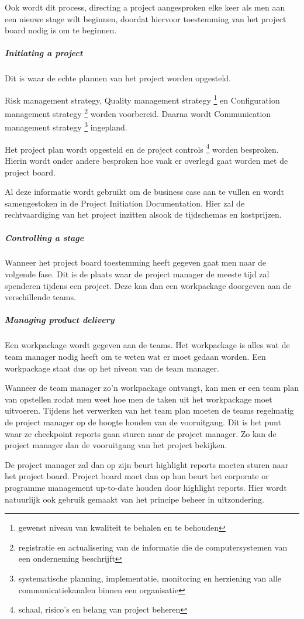 \documentclass[]{article}
\begin{document}
Ook wordt dit process, directing a project aangesproken elke keer als men aan een nieuwe stage wilt beginnen, doordat hiervoor toestemming van het project board nodig is om te beginnen.

\subparagraph{Initiating a project}
Dit is waar de echte plannen van het project worden opgesteld.

Risk management strategy, Quality management strategy \footnote{gewenst niveau van kwaliteit te behalen en te behouden} en Configuration management strategy \footnote{registratie en actualisering van de informatie die de computersystemen van een onderneming beschrijft} worden voorbereid. Daarna wordt Communication management strategy \footnote{
	systematische planning, implementatie, monitoring en herziening van alle communicatiekanalen binnen een organisatie} ingepland.

Het project plan wordt opgesteld en de project controls \footnote{schaal, risico's en belang van project beheren} worden besproken. Hierin wordt onder andere besproken hoe vaak er overlegd gaat worden met de project board.

Al deze informatie wordt gebruikt om de business case aan te vullen en wordt samengestoken in de Project Initiation Documentation. Hier zal de rechtvaardiging van het project inzitten alsook de tijdschemas en kostprijzen.

\subparagraph{Controlling a stage}
Wanneer het project board toestemming heeft gegeven gaat men naar de volgende fase. Dit is de plaats waar de project manager de meeste tijd zal spenderen tijdens een project. Deze kan dan een workpackage doorgeven aan de verschillende teams.

\subparagraph{Managing product delivery}
Een workpackage wordt gegeven aan de teams. Het workpackage is alles wat de team manager nodig heeft om te weten wat er moet gedaan worden. Een workpackage staat dus op het niveau van de team manager. 

Wanneer de team manager zo’n workpackage ontvangt, kan men er een team plan van opstellen zodat men weet hoe men de taken uit het workpackage moet uitvoeren. Tijdens het verwerken van het team plan moeten de teams regelmatig de project manager op de hoogte houden van de vooruitgang. Dit is het punt waar ze checkpoint reports gaan sturen naar de project manager. Zo kan de project manager dan de vooruitgang van het project bekijken. 

De project manager zal dan op zijn beurt highlight reports moeten sturen naar het project board. Project board moet dan op hun beurt het corporate or programme management up-to-date houden door highlight reports. Hier wordt natuurlijk ook gebruik gemaakt van het principe beheer in uitzondering.
\end{document}
